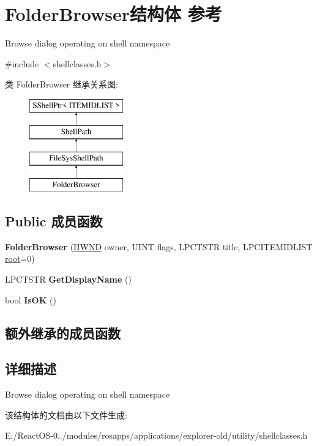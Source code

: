 \hypertarget{struct_folder_browser}{}\section{Folder\+Browser结构体 参考}
\label{struct_folder_browser}


Browse dialog operating on shell namespace  




{\ttfamily \#include $<$shellclasses.\+h$>$}

类 Folder\+Browser 继承关系图\+:\begin{figure}[H]
\begin{center}
\leavevmode
\includegraphics[height=4.000000cm]{struct_folder_browser}
\end{center}
\end{figure}
\subsection*{Public 成员函数}
\begin{DoxyCompactItemize}
\item 
\mbox{\label{struct_folder_browser_a3072a96d12c7586c76d9de31c8e8cf13}} 
{\bfseries Folder\+Browser} (\hyperlink{interfacevoid}{H\+W\+ND} owner, U\+I\+NT flags, L\+P\+C\+T\+S\+TR title, L\+P\+C\+I\+T\+E\+M\+I\+D\+L\+I\+ST \hyperlink{struct__root}{root}=0)
\item 
\mbox{\label{struct_folder_browser_af5de183f8b33379689e8c2d4ac39350e}} 
L\+P\+C\+T\+S\+TR {\bfseries Get\+Display\+Name} ()
\item 
\mbox{\label{struct_folder_browser_a58f0b9131543b2601080ef2fc4965151}} 
bool {\bfseries Is\+OK} ()
\end{DoxyCompactItemize}
\subsection*{额外继承的成员函数}


\subsection{详细描述}
Browse dialog operating on shell namespace 

该结构体的文档由以下文件生成\+:\begin{DoxyCompactItemize}
\item 
E\+:/\+React\+O\+S-\/0../modules/rosapps/applications/explorer-\/old/utility/shellclasses.\+h\end{DoxyCompactItemize}

